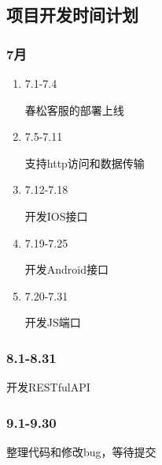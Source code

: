 \documentclass{article}
\begin{document}
\hypertarget{ux9879ux76eeux5f00ux53d1ux65f6ux95f4ux8ba1ux5212}{%
\subsection{项目开发时间计划}\label{ux9879ux76eeux5f00ux53d1ux65f6ux95f4ux8ba1ux5212}}

\hypertarget{ux6708}{%
\subsubsection{7月}\label{ux6708}}

\begin{enumerate}
\item
  7.1-7.4

  春松客服的部署上线
\item
  7.5-7.11

  支持http访问和数据传输
\item
  7.12-7.18

  开发IOS接口
\item
  7.19-7.25

  开发Android接口
\item
  7.20-7.31

  开发JS端口
\end{enumerate}

\hypertarget{section-6}{%
\subsubsection{8.1-8.31}\label{section-6}}

开发RESTfulAPI

\hypertarget{section-7}{%
\subsubsection{9.1-9.30}\label{section-7}}

整理代码和修改bug，等待提交
\end{document}
